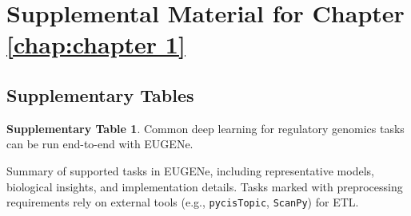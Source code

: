\chapter{Supplemental Material for Chapter \ref{chap:chapter 1}}

\section{Supplementary Tables}

\noindent
\textbf{Supplementary Table 1}. Common deep learning for regulatory genomics tasks can be run end-to-end with EUGENe.

\begin{landscape}
\begin{table}[ht]
\centering
\caption[Summary of supported tasks in EUGENe]{Summary of supported tasks in EUGENe, including representative models, biological insights, and implementation details. Tasks marked with preprocessing requirements rely on external tools (e.g., \texttt{pycisTopic}, \texttt{ScanPy}) for ETL.}
\label{tab:1 supplementary_1}


\end{table}
\end{landscape}
